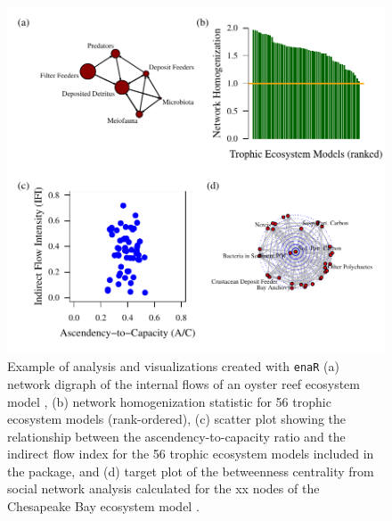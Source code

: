 \documentclass[11pt]{article}
\newcommand{\enaR}{\texttt{enaR}}
\begin{document}
\begin{figure}[h]
\includegraphics[scale=1]{../figures/enaR_plot_example.pdf}
\caption{Example of analysis and visualizations created with \enaR\:
  (a) network digraph of the internal flows of an oyster reef
  ecosystem model \citep{dame81}, (b) network homogenization statistic
  for 56 trophic ecosystem models (rank-ordered), (c) scatter plot
  showing the relationship between the ascendency-to-capacity ratio
  and the indirect flow index for the 56 trophic ecosystem models
  included in the package, and (d) target plot of the betweenness centrality from
  social network analysis calculated for the xx nodes of the
  Chesapeake Bay ecosystem model \citep{baird89}. } \label{fig:example}
\end{figure}
\end{document}
